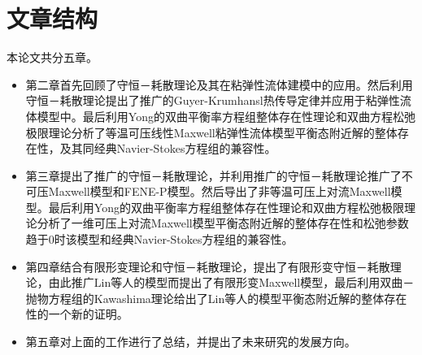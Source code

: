 \section{文章结构}
本论文共分五章。
\begin{itemize}
\item 第二章首先回顾了守恒－耗散理论及其在粘弹性流体建模中的应用。然后利用守恒－耗散理论提出了推广的Guyer-Krumhansl热传导定律并应用于粘弹性流体模型中。最后利用Yong的双曲平衡率方程组整体存在性理论和双曲方程松弛极限理论分析了等温可压线性Maxwell粘弹性流体模型平衡态附近解的整体存在性，及其同经典Navier-Stokes方程组的兼容性。
\item 第三章提出了推广的守恒－耗散理论，并利用推广的守恒－耗散理论推广了不可压Maxwell模型和FENE-P模型。然后导出了非等温可压上对流Maxwell模型。最后利用Yong的双曲平衡率方程组整体存在性理论和双曲方程松弛极限理论分析了一维可压上对流Maxwell模型平衡态附近解的整体存在性和松弛参数趋于$0$时该模型和经典Navier-Stokes方程组的兼容性。
\item 第四章结合有限形变理论和守恒－耗散理论，提出了有限形变守恒－耗散理论，由此推广Lin等人的模型而提出了有限形变Maxwell模型，最后利用双曲－抛物方程组的Kawashima理论给出了Lin等人的模型平衡态附近解的整体存在性的一个新的证明。
\item 第五章对上面的工作进行了总结，并提出了未来研究的发展方向。
\end{itemize}






